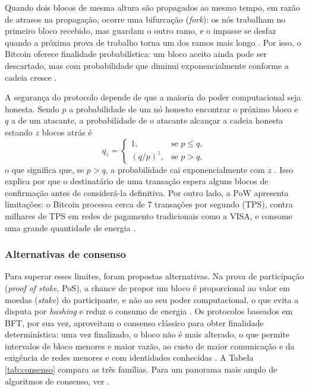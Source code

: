 Quando dois blocos de mesma altura são propagados ao mesmo tempo, em razão de atrasos na propagação, ocorre uma bifurcação (\textit{fork}): os nós trabalham no primeiro bloco recebido, mas guardam o outro ramo, e o impasse se desfaz quando a próxima prova de trabalho torna um dos ramos mais longo \cite{nakamoto2008bitcoin,Xiao2020}. Por isso, o Bitcoin oferece finalidade probabilística: um bloco aceito ainda pode ser descartado, mas com probabilidade que diminui exponencialmente conforme a cadeia cresce \cite{Xiao2020}.

A segurança do protocolo depende de que a maioria do poder computacional seja honesta. Sendo $p$ a probabilidade de um nó honesto encontrar o próximo bloco e $q$ a de um atacante, a probabilidade de o atacante alcançar a cadeia honesta estando $z$ blocos atrás é
\begin{equation}
    q_z =
    \begin{cases}
        1, & \text{se } p \leq q, \\
        (q/p)^z, & \text{se } p > q,
    \end{cases}
    \label{eq:attacker}
\end{equation}
o que significa que, se $p > q$, a probabilidade cai exponencialmente com $z$ \cite{nakamoto2008bitcoin}. Isso explica por que o destinatário de uma transação espera alguns blocos de confirmação antes de considerá-la definitiva. Por outro lado, a PoW apresenta limitações: o Bitcoin processa cerca de 7 transações por segundo (TPS), contra milhares de TPS em redes de pagamento tradicionais como a VISA, e consome uma grande quantidade de energia \cite{Xiao2020}.

\subsubsection{Alternativas de consenso}

Para superar esses limites, foram propostas alternativas. Na prova de participação (\textit{proof of stake}, PoS), a chance de propor um bloco é proporcional ao valor em moedas (\textit{stake}) do participante, e não ao seu poder computacional, o que evita a disputa por \textit{hashing} e reduz o consumo de energia \cite{Xiao2020}. Os protocolos baseados em BFT, por sua vez, aproveitam o consenso clássico para obter finalidade determinística: uma vez finalizado, o bloco não é mais alterado, o que permite intervalos de bloco menores e maior vazão, ao custo de maior comunicação e da exigência de redes menores e com identidades conhecidas \cite{Xiao2020}. A Tabela \ref{tab:consenso} compara as três famílias. Para um panorama mais amplo de algoritmos de consenso, ver \cite{Li2021}.

